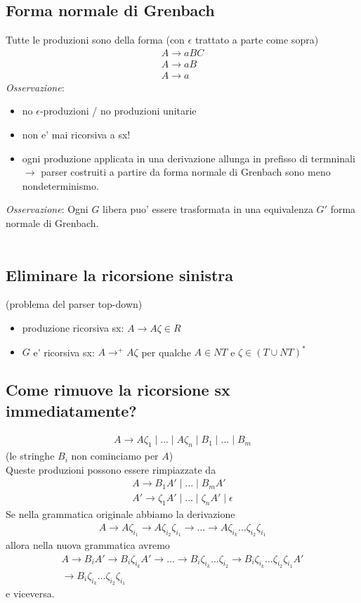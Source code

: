 \documentclass[a4paper,12pt]{article}
\begin{document}
{\subsection*{Forma normale di Grenbach}
Tutte le produzioni sono della forma (con $\epsilon$ trattato a parte come sopra)
\begin{align*}
  A \to aBC \\
  A \to aB \\
  A \to a
\end{align*}
\textit{Osservazione}:
\begin{itemize}
  \item no $\epsilon$-produzioni / no produzioni unitarie
  \item non e' mai ricorsiva a sx!
  \item ogni produzione applicata in una derivazione allunga in prefisso di termninali $\to$ parser costruiti a partire da forma normale di Grenbach  sono meno nondeterminismo. 
\end{itemize}
\textit{Osservazione}: Ogni $G$ libera puo' essere trasformata in una equivalenza $G'$ forma normale di Grenbach. \\
\vspace{1em} \\
\subsection{Eliminare la ricorsione sinistra}
(problema del parser top-down)
\begin{itemize}
  \item produzione ricorsiva sx: $A \to A \zeta \in R$
  \item $G$ e' ricorsiva sx: $A \to^+ A\zeta$ per qualche $A \in NT$ e $\zeta \in (T \cup NT)^*$
\end{itemize}
\subsection*{Come rimuove la ricorsione sx immediatamente?}
\begin{align*}
  A \to A \zeta_1 \mid \dots \mid A \zeta_n \mid B_1 \mid \dots \mid B_m
\end{align*}
(le stringhe $B_i$ non cominciamo per $A$) \\
Queste produzioni possono essere rimpiazzate da 
\begin{align*}
  A \to B_1 A' \mid \dots \mid B_m A' \\
  A' \to \zeta_1 A' \mid \dots \mid \zeta_n A' \mid \epsilon
\end{align*}
Se nella grammatica originale abbiamo la derivazione
\begin{align*}
  A \to A \zeta_{i_1} \to A \zeta_{i_2}\zeta_{i_1} \to \dots \to A\zeta_{i_k} \dots \zeta_{i_2}\zeta_{i_1} 
\end{align*}
allora nella nuova grammatica avremo 
\begin{align*}
  A \to B_i A' \to B_i \zeta_{i_k}A' \to \dots \to B_i \zeta_{i_k} \dots \zeta_{i_2} \to B_i \zeta_{i_k}\dots\zeta_{i_2}\zeta_{i_1}A' \\
  \to B_i \zeta_{i_k}\dots \zeta_{i_2}\zeta_{i_1}
\end{align*}
e viceversa. \\
}
\end{document}
